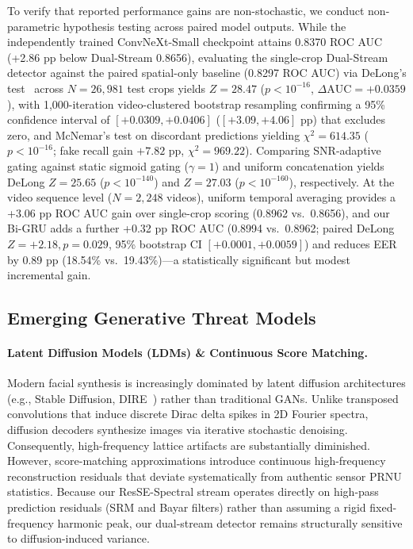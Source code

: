\documentclass[10pt,twocolumn,letterpaper]{article}
\begin{document}
To verify that reported performance gains are non-stochastic, we conduct non-parametric hypothesis testing across paired model outputs. While the independently trained ConvNeXt-Small checkpoint attains 0.8370 ROC AUC (+2.86 pp below Dual-Stream 0.8656), evaluating the single-crop Dual-Stream detector against the paired spatial-only baseline (0.8297 ROC AUC) via DeLong's test~\cite{delong1988comparing} across $N = 26,981$ test crops yields $Z = 28.47$ ($p < 10^{-16}$, $\Delta\mathrm{AUC} = +0.0359$), with 1,000-iteration video-clustered bootstrap resampling confirming a 95\% confidence interval of $[+0.0309, +0.0406]$ ($[+3.09, +4.06]$ pp) that excludes zero, and McNemar's test on discordant predictions yielding $\chi^2 = 614.35$ ($p < 10^{-16}$; fake recall gain $+7.82$ pp, $\chi^2 = 969.22$). Comparing SNR-adaptive gating against static sigmoid gating ($\gamma=1$) and uniform concatenation yields DeLong $Z = 25.65$ ($p < 10^{-140}$) and $Z = 27.03$ ($p < 10^{-160}$), respectively. At the video sequence level ($N = 2,248$ videos), uniform temporal averaging provides a +3.06 pp ROC AUC gain over single-crop scoring (0.8962 vs.\ 0.8656), and our Bi-GRU adds a further +0.32 pp ROC AUC (0.8994 vs.\ 0.8962; paired DeLong $Z = +2.18, p = 0.029$, 95\% bootstrap CI $[+0.0001, +0.0059]$) and reduces EER by 0.89 pp (18.54\% vs.\ 19.43\%)---a statistically significant but modest incremental gain.

\subsection{Emerging Generative Threat Models}
\label{sec:disc_threat_models}

\paragraph{Latent Diffusion Models (LDMs) \& Continuous Score Matching.}
Modern facial synthesis is increasingly dominated by latent diffusion architectures (e.g., Stable Diffusion, DIRE~\cite{wang2023dire}) rather than traditional GANs. Unlike transposed convolutions that induce discrete Dirac delta spikes in 2D Fourier spectra, diffusion decoders synthesize images via iterative stochastic denoising. Consequently, high-frequency lattice artifacts are substantially diminished. However, score-matching approximations introduce continuous high-frequency reconstruction residuals that deviate systematically from authentic sensor PRNU statistics. Because our ResSE-Spectral stream operates directly on high-pass prediction residuals (SRM and Bayar filters) rather than assuming a rigid fixed-frequency harmonic peak, our dual-stream detector remains structurally sensitive to diffusion-induced variance.
\end{document}
